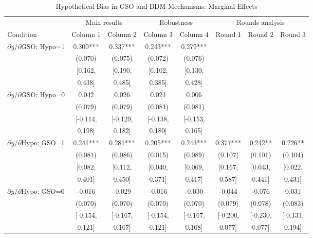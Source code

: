 \documentclass[12pt]{article}
\begin{document}
\begin{table}[H]
\centering
\caption{Hypothetical Bias in GSO and BDM Mechanisms: Marginal Effects}
\label{tab:All_tables}
\scriptsize
\begin{tabular}{l*{7}{c}}
\toprule
& \multicolumn{2}{c}{Main results} & \multicolumn{2}{c}{Robustness} & \multicolumn{3}{c}{Rounds analysis} \\
\cmidrule(lr){2-3} \cmidrule(lr){4-5} \cmidrule(lr){6-8}
Condition & Column 1 & Column 2 & Column 3 & Column 4 & Round 1 & Round 2& Round 3 \\
\midrule

\addlinespace[1.5em]
$\partial y/\partial \text{GSO}$; Hypo=1 & 0.300*** & 0.337*** & 0.243*** & 0.279*** & & & \\
 & (0.070) & (0.075) & (0.072) & (0.076) & & &\\
 & [0.162, & [0.190, & [0.102, & [0.130, & & &\\
 & 0.438] & 0.485] & 0.385] & 0.428] & & &\\
\addlinespace[1.5em]
$\partial y/\partial \text{GSO}$; Hypo=0 & 0.042 & 0.026 & 0.021 & 0.006 & & &\\
 & (0.079) & (0.079) & (0.081) & (0.081) & & &\\
 & [-0.114, & [-0.129, & [-0.138, & [-0.153, & & &\\
 & 0.198] & 0.182] & 0.180] & 0.165] & & &\\
\addlinespace[1.5em]
$\partial y/\partial \text{Hypo}$; GSO=1 & 0.241*** & 0.281*** & 0.205*** & 0.243*** & 0.377***& 0.242**&0.226**\\
 & (0.081) & (0.086) & (0.015) & (0.089) &(0.107) &(0.101) &(0.104)\\
 & [0.082, & [0.112, & [0.040, & [0.069, &[0.167, & [0.043,&[0.022,\\
 & 0.401] & 0.450] & 0.371] & 0.417] &0.587] &0.441] &0.431]\\
\addlinespace[1.5em]
$\partial y/\partial \text{Hypo}$; GSO=0 & -0.016 & -0.029 & -0.016 & -0.030 &-0.044 &-0.076 &0.031\\
 & (0.070) & (0.070) & (0.070) & (0.070) &(0.079) & (0.078)&(0.083)\\
 & [-0.154, & [-0.167, & [-0.154, & [-0.167, &[-0.200, &[-0.230, &[-0.131,\\
 & 0.121] & 0.107] & 0.121] & 0.108] &0.077] & 0.077] &0.194]\\


\end{tabular}
\end{table}
\end{document}
